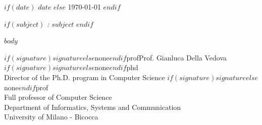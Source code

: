 \documentclass[11pt,a4paper]{article}
\begin{document}
\begin{flushright}
        $if(date)$
        $date$
        $else$
        \today
        $endif$
\end{flushright}

\vspace{1.5em}

$if(subject)$
\noindent \textit{: $subject$}
\vspace{1.5em}
$endif$

$body$

\vspace{3em}
\def\pandocsignature{$if(signature)$$signature$$else$none$endif$}%
\def\phdsignature{phd}%
\def\profsignature{prof}%
\noindent
\ifx\pandocsignature\profsignature Prof. \fi
Gianluca Della Vedova%
\ifx\pandocsignature\phdsignature
\\Director of the Ph.D. program in Computer Science%
\fi
\ifx\pandocsignature\profsignature
\\Full professor of Computer Science\\
Department of Informatics, Systems and Communication\\
University of Milano - Bicocca%
\fi
\end{document}
